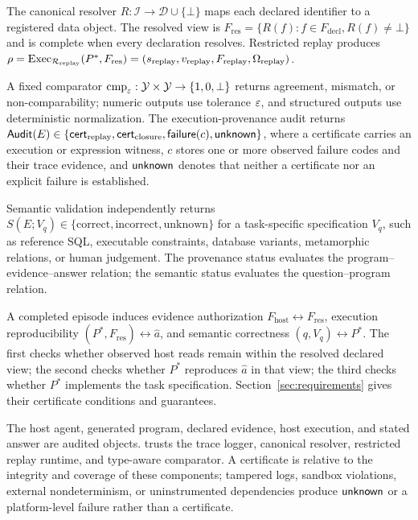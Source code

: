 The canonical resolver $R:\mathcal I\rightarrow\mathcal D\cup\{\bot\}$
maps each declared identifier to a registered data object. The resolved view
is $F_{\mathrm{res}}=\{R(f):f\in F_{\mathrm{decl}},R(f)\neq\bot\}$ and is
complete when every declaration resolves. Restricted replay produces
$\rho=\operatorname{Exec}_{\mathcal R_{\mathrm{replay}}}
(P^*,F_{\mathrm{res}})
=(s_{\mathrm{replay}},v_{\mathrm{replay}},F_{\mathrm{replay}},
\Omega_{\mathrm{replay}})$.

A fixed comparator
$\operatorname{cmp}_{\varepsilon}:\mathcal Y\times\mathcal Y
\rightarrow\{1,0,\bot\}$ returns agreement, mismatch, or non-comparability;
numeric outputs use tolerance $\varepsilon$, and structured outputs use
deterministic normalization. The execution-provenance audit returns
$\mathsf{Audit}(E)\in
\{\mathsf{cert}_{\mathrm{replay}},\mathsf{cert}_{\mathrm{closure}},
\mathsf{failure}(c),\mathsf{unknown}\}$, where a certificate carries an execution or
expression witness, $c$ stores one or more observed failure codes and their
trace evidence, and $\mathsf{unknown}$ denotes that neither a certificate nor an
explicit failure is established.

Semantic validation independently returns
$S(E;V_q)\in\{\mathrm{correct},\mathrm{incorrect},\mathrm{unknown}\}$ for a
task-specific specification $V_q$, such as reference SQL, executable
constraints, database variants, metamorphic relations, or human judgement.
The provenance status evaluates the program--evidence--answer relation; the
semantic status evaluates the question--program relation.

A completed episode induces evidence authorization
$F_{\mathrm{host}}\leftrightarrow F_{\mathrm{res}}$, execution
reproducibility $(P^*,F_{\mathrm{res}})\leftrightarrow\hat a$, and semantic
correctness $(q,V_q)\leftrightarrow P^*$. The first checks whether observed
host reads remain within the resolved declared view; the second checks whether
$P^*$ reproduces $\hat a$ in that view; the third checks whether $P^*$
implements the task specification. Section~\ref{sec:requirements} gives their
certificate conditions and guarantees.

The host agent, generated program, declared evidence, host execution, and
stated answer are audited objects. \ledger trusts the trace logger, canonical
resolver, restricted replay runtime, and type-aware comparator. A certificate
is relative to the integrity and coverage of these components; tampered logs,
sandbox violations, external nondeterminism, or uninstrumented dependencies
produce $\mathsf{unknown}$ or a platform-level failure rather than a certificate.


